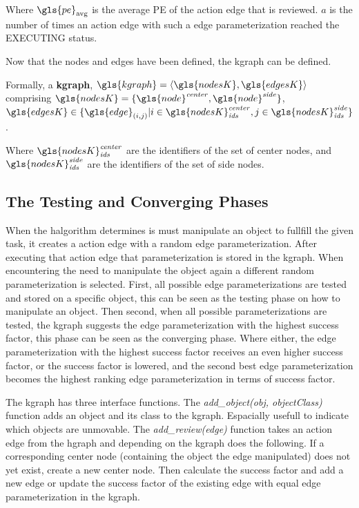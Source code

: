Where $\gls{pe}_\textrm{avg}$ is the average \ac{PE} of the action edge that is reviewed. $a$ is the number of times an action edge with such a edge parameterization reached the EXECUTING status.\bs

\noindent Now that the nodes and edges have been defined, the \ac{kgraph} can be defined.\bs

Formally, a \textbf{\acl{kgraph}}, $\gls{kgraph} = \left\langle \gls{nodesK}, \gls{edgesK} \right\rangle $
\\comprising $\gls{nodesK} = \{\gls{node}^{\mathit{center}}, \gls{node}^{\mathit{side}}\}$, \quad $\gls{edgesK} \in \{\gls{edge}_{(i,j)}| i \in \gls{nodesK}^\mathit{center}_\mathit{ids}, j \in \gls{nodesK}^\mathit{side}_\mathit{ids} \}$.\bs

Where $\gls{nodesK}^\mathit{center}_\mathit{ids}$ are the identifiers of the set of center nodes, and $\gls{nodesK}^\mathit{side}_\mathit{ids}$ are the identifiers of the set of side nodes.\bs


\subsection{The Testing and Converging Phases}
When the \ac{halgorithm} determines is must manipulate an object to fullfill the given task, it creates a action edge with a random edge parameterization. After executing that action edge that parameterization is stored in the \ac{kgraph}. When encountering the need to manipulate the object again a different random parameterization is selected. First, all possible edge parameterizations are tested and stored on a specific object, this can be seen as the testing phase on how to manipulate an object. Then second, when all possible parameterizations are tested, the \ac{kgraph} suggests the edge parameterization with the highest success factor, this phase can be seen as the converging phase. Where either, the edge parameterization with the highest success factor receives an even higher success factor, or the success factor is lowered, and the second best edge parameterization becomes the highest ranking edge parameterization in terms of success factor.\bs

The \ac{kgraph} has three interface functions. The \textit{add\_object(\gls{obj}, \gls{objectClass})} function adds an object and its class to the \ac{kgraph}. Espacially usefull to indicate which objects are unmovable. The \textit{add\_review(\gls{edge})} function takes an action edge from the \ac{hgraph} and depending on the \ac{kgraph} does the following. If a corresponding center node (containing the object the edge manipulated) does not yet exist, create a new center node. Then calculate the success factor and add a new edge or update the success factor of the existing edge with equal edge parameterization in the \ac{kgraph}.  


